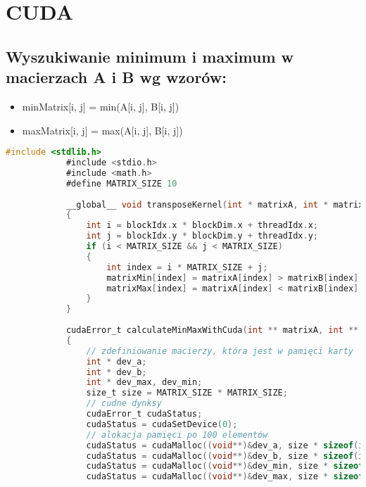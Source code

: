 \newpage
\section{CUDA}
	\subsection{Wyszukiwanie minimum i maximum w macierzach A i B wg wzorów:}
		\begin{itemize}
			\item minMatrix[i, j] = min(A[i, j], B[i, j])
			\item maxMatrix[i, j] = max(A[i, j], B[i, j])
		\end{itemize}
		\begin{lstlisting}[language=C]
			#include <stdlib.h>
			#include <stdio.h>
			#include <math.h>
			#define MATRIX_SIZE 10
			
			__global__ void transposeKernel(int * matrixA, int * matrixB, int * matrixMin, int * matrixMax)
			{
				int i = blockIdx.x * blockDim.x + threadIdx.x;
				int j = blockIdx.y * blockDim.y + threadIdx.y;
				if (i < MATRIX_SIZE && j < MATRIX_SIZE)
				{
					int index = i * MATRIX_SIZE + j;
					matrixMin[index] = matrixA[index] > matrixB[index] ? matrixB[index] : matrixA[index];
					matrixMax[index] = matrixA[index] < matrixB[index] ? matrixB[index] : matrixA[index];
				}
			}
			
			cudaError_t calculateMinMaxWithCuda(int ** matrixA, int ** matrixB, int ** matrixMin, int ** matrixMax)
			{
				// zdefiniowanie macierzy, która jest w pamięci karty
				int * dev_a;
				int * dev_b;
				int * dev_max, dev_min;
				size_t size = MATRIX_SIZE * MATRIX_SIZE;
				// cudne dynksy
				cudaError_t cudaStatus;
				cudaStatus = cudaSetDevice(0);
				// alokacja pamięci po 100 elementów
				cudaStatus = cudaMalloc((void**)&dev_a, size * sizeof(int));
				cudaStatus = cudaMalloc((void**)&dev_b, size * sizeof(int));
				cudaStatus = cudaMalloc((void**)&dev_min, size * sizeof(int));
				cudaStatus = cudaMalloc((void**)&dev_max, size * sizeof(int));
			\end{lstlisting}
			\newpage
